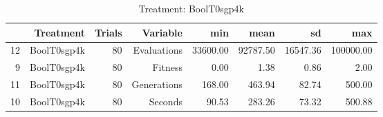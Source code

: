 \begin{table}[ht]
\centering
\begin{tabular}{rrrrrrrr}
  \hline
 & Treatment & Trials & Variable & min & mean & sd & max \\ 
  \hline
12 & BoolT0sgp4k &  80 & Evaluations & 33600.00 & 92787.50 & 16547.36 & 100000.00 \\ 
  9 & BoolT0sgp4k &  80 & Fitness & 0.00 & 1.38 & 0.86 & 2.00 \\ 
  11 & BoolT0sgp4k &  80 & Generations & 168.00 & 463.94 & 82.74 & 500.00 \\ 
  10 & BoolT0sgp4k &  80 & Seconds & 90.53 & 283.26 & 73.32 & 500.88 \\ 
   \hline
\end{tabular}
\caption{Treatment: BoolT0sgp4k} 
\end{table}
